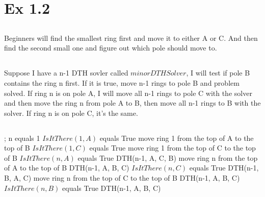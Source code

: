 \section{Ex 1.2}

\subsection{ }
Beginners will find the smallest ring first and move it to either A or C. And then find the second small one and figure out which pole should move to.
\subsection{}
Suppose I have a n-1 DTH sovler called $minorDTHSolver$, I will test if pole B contains the ring n first. If it is true, move n-1 rings to pole B and problem solved. 
If ring n is on pole A, I will move all n-1 rings to pole C with the solver and then move the ring n from pole A to B, then move all n-1 rings to B with the solver. If ring n is on pole C, it's the same.

\subsection{}
\noindent
\Prog\qq     %
; \qq  %
\If n equals 1 \Then \qq
\If $IsItThere(1, A)$ equals True \Then\qq
move ring 1 from the top of A to the top of B\qq
\Elseif $IsItThere(1, C)$ equals True \Then\qq
move ring 1 from the top of C to the top of B\qq
\Endif\qq
%
\Else\qq
\If $IsItThere(n, A)$ equals True \Then\qq
DTH(n-1, A, C, B)\qq
move ring n from the top of A to the top of B\qq
DTH(n-1, A, B, C)\qq
\Elseif $IsItThere(n, C)$ equals True \Then\qq
DTH(n-1, B, A, C)\qq
move ring n from the top of C to the top of B\qq
DTH(n-1, A, B, C)\qq
\Elseif $IsItThere(n, B)$ equals True \Then\qq
DTH(n-1, A, B, C)\qq
\Endif\qq
\Endif\qq
\Fini %

